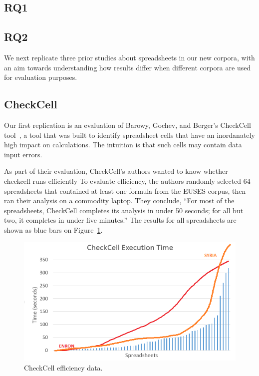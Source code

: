 \documentclass{sig-alternate} %
\begin{document}
\subsection{RQ1}

\subsection{RQ2}

We next replicate three prior studies about spreadsheets in our new corpora,
with an aim towards understanding how results differ when different corpora are
used for evaluation purposes.

\subsection{CheckCell}

Our first replication is an evaluation of Barowy, Gochev, and Berger's
CheckCell tool~\cite{Barowy14}, a tool that was built to identify spreadsheet
cells that have an inordanately high impact on calculations.
The intuition is that such cells may contain data input errors.

As part of their evaluation, CheckCell's authors wanted to know whether checkcell runs efficiently
To evaluate efficiency, the authors randomly selected 64 spreadsheets that contained at least one
formula from the EUSES corpus, then ran their analysis on a commodity laptop.
They conclude, ``For most of the spreadsheets, CheckCell completes its analysis in under 50 seconds;
for all but two, it completes in under five minutes.''
The results for all spreadsheets are shown as blue bars on Figure~\ref{fig:effectiveness}.

\begin{figure}
\centering
\includegraphics[width=\columnwidth]{checkcell.png}
\caption{CheckCell efficiency data.}
\label{fig:effectiveness}
\end{figure}
\end{document}
